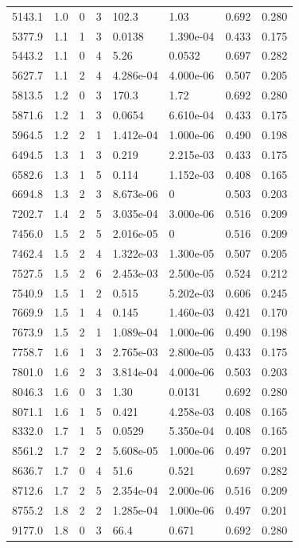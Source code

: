 \documentclass[preview]{standalone}
\begin{document}
{{{\begin{tabular}{L{1.2cm}C{1.2cm} C{0.3cm}C{0.5cm} C{1.4cm}C{1.4cm} C{1.4cm}C{1.4cm}}
  5143.1  &   1.0  & 0     &  3 &  102.3  & 1.03  & 0.692 &  0.280   \\ 
  5377.9  &   1.1  & 1     &  3 &  0.0138  & 1.390e-04  & 0.433 &  0.175   \\ 
  5443.2  &   1.1  & 0     &  4 &  5.26  & 0.0532  & 0.697 &  0.282   \\ 
  5627.7  &   1.1  & 2     &  4 &  4.286e-04  & 4.000e-06  & 0.507 &  0.205   \\ 
  5813.5  &   1.2  & 0     &  3 &  170.3  & 1.72  & 0.692 &  0.280   \\ 
  5871.6  &   1.2  & 1     &  3 &  0.0654  & 6.610e-04  & 0.433 &  0.175   \\ 
  5964.5  &   1.2  & 2     &  1 &  1.412e-04  & 1.000e-06  & 0.490 &  0.198   \\ 
  6494.5  &   1.3  & 1     &  3 &  0.219  & 2.215e-03  & 0.433 &  0.175   \\ 
  6582.6  &   1.3  & 1     &  5 &  0.114  & 1.152e-03  & 0.408 &  0.165   \\ 
  6694.8  &   1.3  & 2     &  3 &  8.673e-06  & 0  & 0.503 &  0.203   \\ 
  7202.7  &   1.4  & 2     &  5 &  3.035e-04  & 3.000e-06  & 0.516 &  0.209   \\ 
  7456.0  &   1.5  & 2     &  5 &  2.016e-05  & 0  & 0.516 &  0.209   \\ 
  7462.4  &   1.5  & 2     &  4 &  1.322e-03  & 1.300e-05  & 0.507 &  0.205   \\ 
  7527.5  &   1.5  & 2     &  6 &  2.453e-03  & 2.500e-05  & 0.524 &  0.212   \\ 
  7540.9  &   1.5  & 1     &  2 &  0.515  & 5.202e-03  & 0.606 &  0.245   \\ 
  7669.9  &   1.5  & 1     &  4 &  0.145  & 1.460e-03  & 0.421 &  0.170   \\ 
  7673.9  &   1.5  & 2     &  1 &  1.089e-04  & 1.000e-06  & 0.490 &  0.198   \\ 
  7758.7  &   1.6  & 1     &  3 &  2.765e-03  & 2.800e-05  & 0.433 &  0.175   \\ 
  7801.0  &   1.6  & 2     &  3 &  3.814e-04  & 4.000e-06  & 0.503 &  0.203   \\ 
  8046.3  &   1.6  & 0     &  3 &  1.30  & 0.0131  & 0.692 &  0.280   \\ 
  8071.1  &   1.6  & 1     &  5 &  0.421  & 4.258e-03  & 0.408 &  0.165   \\ 
  8332.0  &   1.7  & 1     &  5 &  0.0529  & 5.350e-04  & 0.408 &  0.165   \\ 
  8561.2  &   1.7  & 2     &  2 &  5.608e-05  & 1.000e-06  & 0.497 &  0.201   \\ 
  8636.7  &   1.7  & 0     &  4 &  51.6  & 0.521  & 0.697 &  0.282   \\ 
  8712.6  &   1.7  & 2     &  5 &  2.354e-04  & 2.000e-06  & 0.516 &  0.209   \\ 
  8755.2  &   1.8  & 2     &  2 &  1.285e-04  & 1.000e-06  & 0.497 &  0.201   \\ 
  9177.0  &   1.8  & 0     &  3 &  66.4  & 0.671  & 0.692 &  0.280   \\ 
\hline 
\end{tabular} 

}}}
\end{document}
